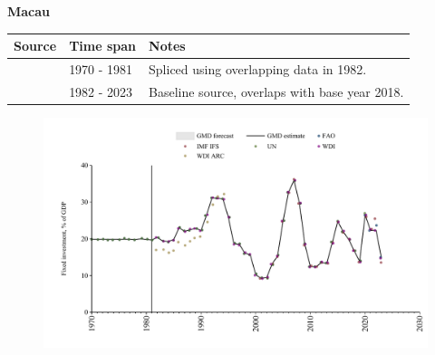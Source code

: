 \documentclass[12pt,a4paper,landscape]{article}
\begin{document}
\begin{adjustbox}{max totalsize={\paperwidth}{\paperheight},center}
\begin{minipage}[t][\textheight][t]{\textwidth}
\vspace*{0.5cm}
{}
\begin{center}
{\Large\bfseries Macau}
\end{center}
\vspace{0.5cm}
\begin{table}[H]
\centering
\small
\begin{tabular}{|l|l|l|}
\hline
\textbf{Source} & \textbf{Time span} & \textbf{Notes} \\
\hline
\rowcolor{white}\cite{UN}& 1970 - 1981 &Spliced using overlapping data in 1982.\\
\rowcolor{lightgray}\cite{WDI}& 1982 - 2023 &Baseline source, overlaps with base year 2018.\\
\hline
\end{tabular}
\end{table}
\begin{figure}[H]
\centering
\includegraphics[width=\textwidth,height=0.6\textheight,keepaspectratio]{graphs/MAC_finv_GDP.pdf}
\end{figure}
\end{minipage}
\end{adjustbox}
\end{document}
